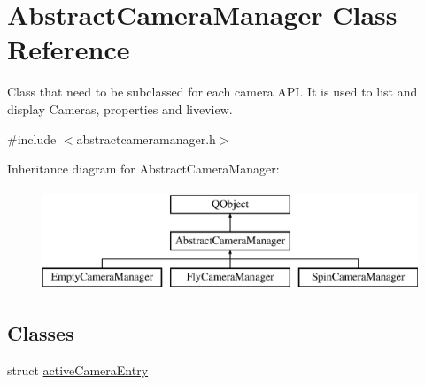 \hypertarget{class_abstract_camera_manager}{}\section{Abstract\+Camera\+Manager Class Reference}
\label{class_abstract_camera_manager}


Class that need to be subclassed for each camera A\+PI. It is used to list and display Cameras, properties and liveview.  




{\ttfamily \#include $<$abstractcameramanager.\+h$>$}

Inheritance diagram for Abstract\+Camera\+Manager\+:\begin{figure}[H]
\begin{center}
\leavevmode
\includegraphics[height=3.000000cm]{class_abstract_camera_manager}
\end{center}
\end{figure}
\subsection*{Classes}
\begin{DoxyCompactItemize}
\item 
struct \mbox{\hyperlink{struct_abstract_camera_manager_1_1active_camera_entry}{active\+Camera\+Entry}}
\end{DoxyCompactItemize}
